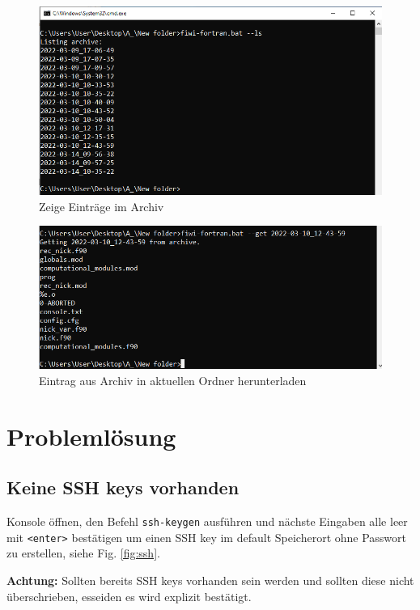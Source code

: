 \documentclass[11pt, a4paper]{article}
\begin{document}
\begin{figure}[h]
    \centering
    \includegraphics[width=0.7\linewidth]{./pics/2022-03-16_16-31.png}
    \caption{Zeige Einträge im Archiv}
    \label{fig:script-ls}
\end{figure}
\begin{figure}[h]
    \centering
    \includegraphics[width=0.7\linewidth]{./pics/2022-03-16_16-33_1.png}
    \caption{Eintrag aus Archiv in aktuellen Ordner herunterladen}
    \label{fig:script-get}
\end{figure}



\clearpage
\section{Problemlösung}

\subsection{Keine SSH keys vorhanden}\label{sec:ssh}
Konsole öffnen, den Befehl \texttt{ssh-keygen} ausführen und nächste Eingaben alle leer mit \texttt{<enter>} bestätigen um einen SSH key im default Speicherort ohne Passwort zu erstellen, siehe Fig. \ref{fig:ssh}.

\textbf{Achtung:} Sollten bereits SSH keys vorhanden sein werden und sollten diese nicht überschrieben, esseiden es wird explizit bestätigt.
\end{document}
